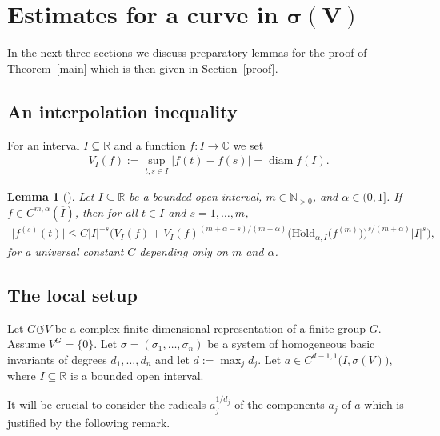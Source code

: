 \documentclass[11pt]{article}
\numberwithin{equation}{section}
\numberwithin{equation}{section}
\newtheorem{Lemma}[Theorem]{Lemma}
\def\al{\alpha}
\def\si{\sigma}
\def\C{\mathbb{C}}
\def\N{\mathbb{N}}
\def\R{\mathbb{R}}
\def\ol{\overline}
\def\Hoeld{\on{H\ddot{o}ld}}
\def\acts{\circlearrowleft}
\let\on=\operatorname
\begin{document}
\section[Estimates for a curve in sigma(V)]{Estimates for a curve in $\boldsymbol{\si(V)}$} \label{aestimates}

In the next three sections we discuss preparatory lemmas for the proof of Theorem~\ref{main} which is then
given in Section~\ref{proof}.

\subsection{An interpolation inequality}
For an interval $I \subseteq \R$ and a function $f \colon I \to \C$ we set
\begin{gather*}
 V_I(f) := \sup_{t,s \in I} |f(t)-f(s)| = \on{diam} f(I).
\end{gather*}

\begin{Lemma}[{\cite[Lemma 4]{ParusinskiRainer15}}] \label{taylor}
 Let $I \subseteq \R$ be a bounded open interval, $m \in \N_{>0}$, and $\al \in (0,1]$.
 If $f\in C^{m,\al}(\overline I)$, then for all $t\in I$
 and $s = 1,\dots,m$,
 \begin{gather*}
 \big|f^{(s)}(t) \big| \le C |I|^{-s} \bigl(V_I(f) + V_I(f)^{(m+\al-s)/(m+\al)} \big(\Hoeld_{\al,I}\big(f^{(m)}\big)\big)^{s/(m+\al)} |I|^s
 \bigr),
 \end{gather*}
 for a universal constant $C$ depending only on $m$ and $\al$.
\end{Lemma}

\subsection{The local setup}

Let $G \acts V$ be a complex finite-dimensional representation of a finite group $G$.
Assume $V^G = \{0\}$. Let $\si=(\si_1,\dots,\si_n)$ be a system of homogeneous basic invariants
of degrees $d_1,\dots, d_n$ and let $d := \max_j d_j$.
Let $a \in C^{d-1,1}\big(\ol I,\si(V)\big)$, where $I \subseteq \R$ is a bounded open interval.

It will be crucial to consider the radicals $a_j^{1/d_j}$ of the components $a_j$ of $a$ which is justified by the following remark.
\end{document}
